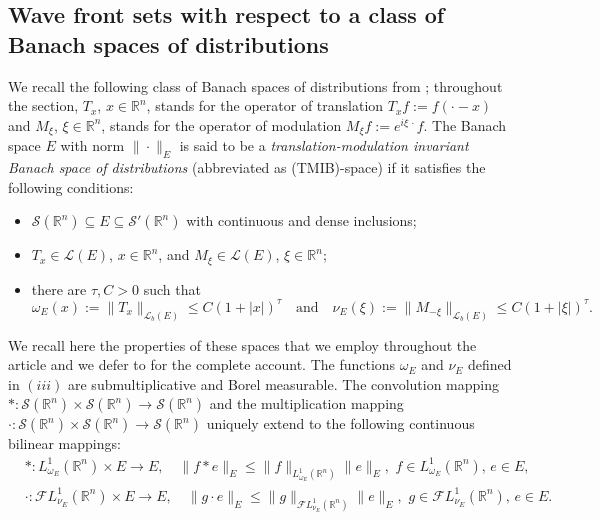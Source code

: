 \documentclass[12pt,reqno]{amsart}
\newcommand{\RR}{\mathbb R}
\newcommand{\SSS}{\mathcal S}
\theoremstyle{plain}
\theoremstyle{remark}
\theoremstyle{definition}
\numberwithin{equation}{section}
\begin{document}
\subsection{Wave front sets with respect to a class of Banach spaces of distributions}


We recall the following class of Banach spaces of distributions from \cite{DPPV-TMIB}; throughout the section, $T_x$, $x\in\RR^n$, stands for the operator of translation $T_xf:=f(\cdot-x)$ and $M_{\xi}$, $\xi\in\RR^n$, stands for the operator of modulation $M_{\xi}f:=e^{i\xi\,\cdot}f$. The Banach space $E$ with norm $\|\cdot\|_E$ is said to be a \textit{translation-modulation invariant Banach space of distributions} (abbreviated as (TMIB)-space) if it satisfies the following conditions:
\begin{itemize}
\item[$(i)$] $\SSS(\RR^n)\subseteq E\subseteq \SSS'(\RR^n)$ with continuous and dense inclusions;
\item[$(ii)$] $T_x\in\mathcal{L}(E)$, $x\in\RR^n$, and $M_{\xi}\in\mathcal{L}(E)$, $\xi\in\RR^n$;
\item[$(iii)$] there are $\tau,C>0$ such that
\begin{equation*}
\omega_E(x):=\|T_x\|_{\mathcal{L}_b(E)}\leq C(1+|x|)^{\tau}\quad \mbox{and}\quad \nu_E(\xi):=\|M_{-\xi}\|_{\mathcal{L}_b(E)}\leq C(1+|\xi|)^{\tau}.
\end{equation*}
\end{itemize}
We recall here the properties of these spaces that we employ throughout the article and we defer to \cite{DPPV-TMIB} for the complete account. The functions $\omega_E$ and $\nu_E$ defined in $(iii)$ are submultiplicative and Borel measurable. The convolution mapping $*:\SSS(\RR^n)\times\SSS(\RR^n)\rightarrow \SSS(\RR^n)$ and the multiplication mapping $\cdot:\SSS(\RR^n)\times\SSS(\RR^n)\rightarrow\SSS(\RR^n)$ uniquely extend to the following continuous bilinear mappings:
\begin{align}
&*:L^1_{\omega_E}(\RR^n)\times E\rightarrow E,\quad \|f*e\|_E\leq \|f\|_{L^1_{\omega_E}(\RR^n)}\|e\|_E,\,\, f\in L^1_{\omega_E}(\RR^n),\, e\in E,\label{con-module-ine}\\
&\cdot:\mathcal{F}L^1_{\nu_E}(\RR^n)\times E\rightarrow E,\quad \|g\cdot e\|_E\leq \|g\|_{\mathcal{F}L^1_{\nu_E}(\RR^n)}\|e\|_E,\,\, g\in\mathcal{F}L^1_{\nu_E}(\RR^n),\, e\in E.\label{mult-module-ine}
\end{align}
\end{document}
